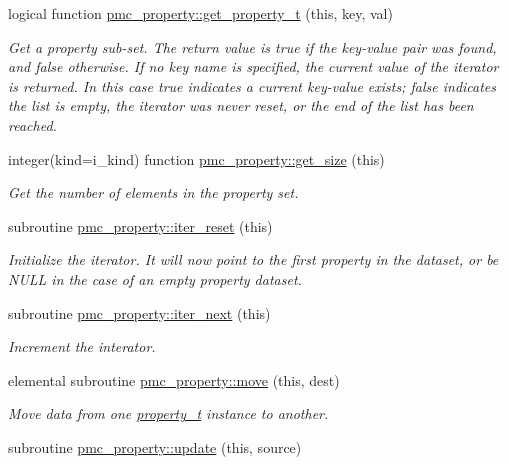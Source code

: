 \begin{DoxyCompactItemize}
logical function \mbox{\hyperlink{namespacepmc__property_a280146ecd87b8624c170babd262c92d3}{pmc\+\_\+property\+::get\+\_\+property\+\_\+t}} (this, key, val)
\begin{DoxyCompactList}\small\item\em Get a property sub-\/set. The return value is true if the key-\/value pair was found, and false otherwise. If no key name is specified, the current value of the iterator is returned. In this case true indicates a current key-\/value exists; false indicates the list is empty, the iterator was never reset, or the end of the list has been reached. \end{DoxyCompactList}\item 
integer(kind=i\+\_\+kind) function \mbox{\hyperlink{namespacepmc__property_a51142a5a96c616638b781bc56dd808a9}{pmc\+\_\+property\+::get\+\_\+size}} (this)
\begin{DoxyCompactList}\small\item\em Get the number of elements in the property set. \end{DoxyCompactList}\item 
subroutine \mbox{\hyperlink{namespacepmc__property_ace8273ce459baf8c3e805c010f66103c}{pmc\+\_\+property\+::iter\+\_\+reset}} (this)
\begin{DoxyCompactList}\small\item\em Initialize the iterator. It will now point to the first property in the dataset, or be N\+U\+LL in the case of an empty property dataset. \end{DoxyCompactList}\item 
subroutine \mbox{\hyperlink{namespacepmc__property_a8bde8118d90903ed86a787823b208eb5}{pmc\+\_\+property\+::iter\+\_\+next}} (this)
\begin{DoxyCompactList}\small\item\em Increment the interator. \end{DoxyCompactList}\item 
elemental subroutine \mbox{\hyperlink{namespacepmc__property_abaf7837b3c0512087cad8e4e9c673b70}{pmc\+\_\+property\+::move}} (this, dest)
\begin{DoxyCompactList}\small\item\em Move data from one \mbox{\hyperlink{structpmc__property_1_1property__t}{property\+\_\+t}} instance to another. \end{DoxyCompactList}\item 
subroutine \mbox{\hyperlink{namespacepmc__property_a5d890d5f6a8fb12ceb429ae3ebc217fe}{pmc\+\_\+property\+::update}} (this, source)

\end{DoxyCompactItemize}
